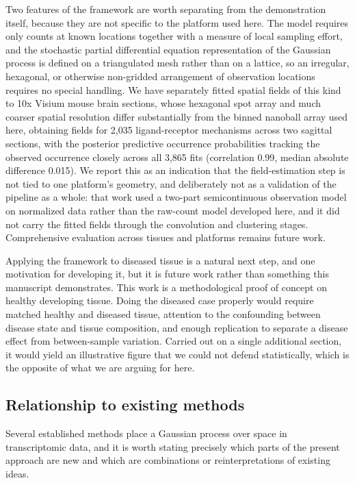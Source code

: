 \documentclass[10pt,letterpaper]{article}
\begin{document}
Two features of the framework are worth separating from the demonstration itself, because they are not specific to the platform used here. The model requires only counts at known locations together with a measure of local sampling effort, and the stochastic partial differential equation representation of the Gaussian process is defined on a triangulated mesh rather than on a lattice, so an irregular, hexagonal, or otherwise non-gridded arrangement of observation locations requires no special handling. We have separately fitted spatial fields of this kind to 10x Visium mouse brain sections, whose hexagonal spot array and much coarser spatial resolution differ substantially from the binned nanoball array used here, obtaining fields for 2,035 ligand-receptor mechanisms across two sagittal sections, with the posterior predictive occurrence probabilities tracking the observed occurrence closely across all 3,865 fits (correlation 0.99, median absolute difference 0.015). We report this as an indication that the field-estimation step is not tied to one platform's geometry, and deliberately not as a validation of the pipeline as a whole: that work used a two-part semicontinuous observation model on normalized data rather than the raw-count model developed here, and it did not carry the fitted fields through the convolution and clustering stages. Comprehensive evaluation across tissues and platforms remains future work.

Applying the framework to diseased tissue is a natural next step, and one motivation for developing it, but it is future work rather than something this manuscript demonstrates. This work is a methodological proof of concept on healthy developing tissue. Doing the diseased case properly would require matched healthy and diseased tissue, attention to the confounding between disease state and tissue composition, and enough replication to separate a disease effect from between-sample variation. Carried out on a single additional section, it would yield an illustrative figure that we could not defend statistically, which is the opposite of what we are arguing for here.

\subsection*{Relationship to existing methods}

Several established methods place a Gaussian process over space in transcriptomic data, and it is worth stating precisely which parts of the present approach are new and which are combinations or reinterpretations of existing ideas.
\end{document}
